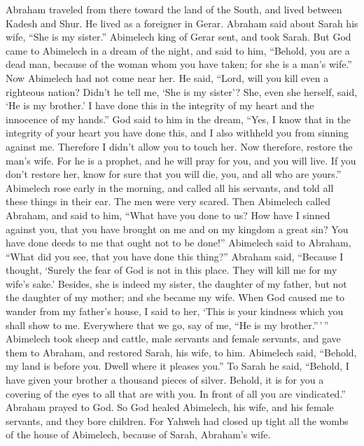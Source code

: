  Abraham traveled from there toward the land of the South,
and lived between Kadesh and Shur. He lived as a foreigner in Gerar.
 Abraham said about Sarah his wife, ``She is my sister.''
Abimelech king of Gerar sent, and took Sarah.  But God
came to Abimelech in a dream of the night, and said to him, ``Behold,
you are a dead man, because of the woman whom you have taken; for she is
a man's wife.''  Now Abimelech had not come near her. He
said, ``Lord, will you kill even a righteous nation? 
Didn't he tell me, `She is my sister'? She, even she herself, said, `He
is my brother.' I have done this in the integrity of my heart and the
innocence of my hands.''  God said to him in the dream,
``Yes, I know that in the integrity of your heart you have done this,
and I also withheld you from sinning against me. Therefore I didn't
allow you to touch her.  Now therefore, restore the man's
wife. For he is a prophet, and he will pray for you, and you will live.
If you don't restore her, know for sure that you will die, you, and all
who are yours.''  Abimelech rose early in the morning, and
called all his servants, and told all these things in their ear. The men
were very scared.  Then Abimelech called Abraham, and said
to him, ``What have you done to us? How have I sinned against you, that
you have brought on me and on my kingdom a great sin? You have done
deeds to me that ought not to be done!''  Abimelech said
to Abraham, ``What did you see, that you have done this thing?''
 Abraham said, ``Because I thought, `Surely the fear of
God is not in this place. They will kill me for my wife's sake.'
 Besides, she is indeed my sister, the daughter of my
father, but not the daughter of my mother; and she became my wife.
 When God caused me to wander from my father's house, I
said to her, `This is your kindness which you shall show to me.
Everywhere that we go, say of me, ``He is my brother.''\,'\,''
 Abimelech took sheep and cattle, male servants and
female servants, and gave them to Abraham, and restored Sarah, his wife,
to him.  Abimelech said, ``Behold, my land is before you.
Dwell where it pleases you.''  To Sarah he said,
``Behold, I have given your brother a thousand pieces of silver. Behold,
it is for you a covering of the eyes to all that are with you. In front
of all you are vindicated.''  Abraham prayed to God. So
God healed Abimelech, his wife, and his female servants, and they bore
children.  For Yahweh had closed up tight all the wombs
of the house of Abimelech, because of Sarah, Abraham's wife.

